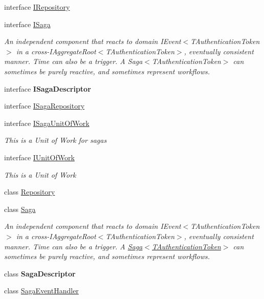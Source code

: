 \begin{DoxyCompactItemize}
\item 
interface \hyperlink{interfaceCqrs_1_1Domain_1_1IRepository}{I\+Repository}
\item 
interface \hyperlink{interfaceCqrs_1_1Domain_1_1ISaga}{I\+Saga}
\begin{DoxyCompactList}\small\item\em An independent component that reacts to domain I\+Event$<$\+T\+Authentication\+Token$>$ in a cross-\/I\+Aggregate\+Root$<$\+T\+Authentication\+Token$>$, eventually consistent manner. Time can also be a trigger. A Saga$<$\+T\+Authentication\+Token$>$ can sometimes be purely reactive, and sometimes represent workflows. \end{DoxyCompactList}\item 
interface {\bfseries I\+Saga\+Descriptor}
\item 
interface \hyperlink{interfaceCqrs_1_1Domain_1_1ISagaRepository}{I\+Saga\+Repository}
\item 
interface \hyperlink{interfaceCqrs_1_1Domain_1_1ISagaUnitOfWork}{I\+Saga\+Unit\+Of\+Work}
\begin{DoxyCompactList}\small\item\em This is a Unit of Work for sagas \end{DoxyCompactList}\item 
interface \hyperlink{interfaceCqrs_1_1Domain_1_1IUnitOfWork}{I\+Unit\+Of\+Work}
\begin{DoxyCompactList}\small\item\em This is a Unit of Work \end{DoxyCompactList}\item 
class \hyperlink{classCqrs_1_1Domain_1_1Repository}{Repository}
\item 
class \hyperlink{classCqrs_1_1Domain_1_1Saga}{Saga}
\begin{DoxyCompactList}\small\item\em An independent component that reacts to domain I\+Event$<$\+T\+Authentication\+Token$>$ in a cross-\/I\+Aggregate\+Root$<$\+T\+Authentication\+Token$>$, eventually consistent manner. Time can also be a trigger. A \hyperlink{classCqrs_1_1Domain_1_1Saga_a1b6019cecbbf2572b64dd456cb5d91a2_a1b6019cecbbf2572b64dd456cb5d91a2}{Saga$<$\+T\+Authentication\+Token$>$} can sometimes be purely reactive, and sometimes represent workflows. \end{DoxyCompactList}\item 
class {\bfseries Saga\+Descriptor}
\item 
class \hyperlink{classCqrs_1_1Domain_1_1SagaEventHandler}{Saga\+Event\+Handler}

\end{DoxyCompactItemize}

